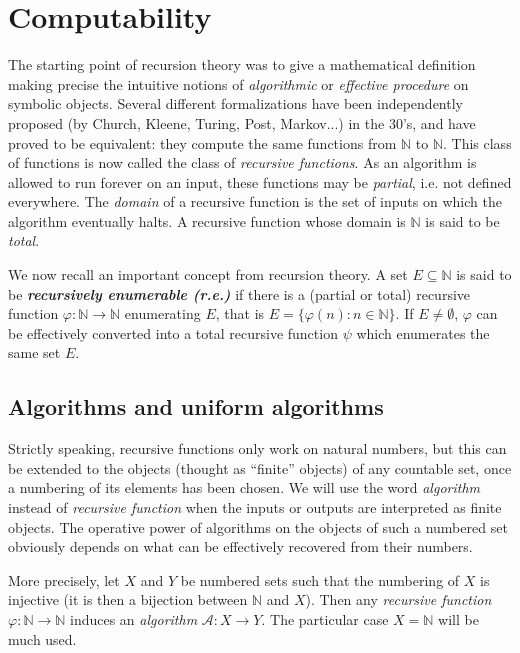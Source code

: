 \documentclass[copyright,creativecommons]{eptcs}
\numberwithin{equation}{section}
\begin{document}
\section{Computability}

The starting point of recursion theory was to give a mathematical definition
making precise the intuitive notions of \emph{algorithmic} or \emph{effective procedure} on symbolic objects. Several different formalizations
have been independently proposed (by Church, Kleene, Turing, Post,
Markov...) in the 30's, and have proved to be equivalent: they compute the
same functions from $\mathbb{N}$ to $\mathbb{N}$. This class of functions is
now called the class of \emph{recursive functions}. As an algorithm is
allowed to run forever on an input, these functions may be \emph{partial},
i.e. not defined everywhere. The \emph{domain} of a recursive function is
the set of inputs on which the algorithm eventually halts. A recursive
function whose domain is $\mathbb{N}$ is said to be \emph{total}.

We now recall an important concept from recursion theory. A set $E\subseteq
\mathbb{N}$ is said to be \textbf{\emph{recursively enumerable (r.e.)}} if
there is a (partial or total) recursive function $\varphi :\mathbb{N}\rightarrow \mathbb{N}$ enumerating $E$, that is $E=\{\varphi (n):n\in
\mathbb{N}\}$. If $E\neq \emptyset $, $\varphi $ can be effectively
converted into a total recursive function $\psi $ which enumerates the same
set $E$.

\subsection{Algorithms and uniform algorithms}

Strictly speaking, recursive functions only work on natural numbers, but
this can be extended to the objects (thought as ``finite'' objects) of any
countable set, once a numbering of its elements has been chosen. We will use
the word \emph{algorithm} instead of \emph{recursive function} when the
inputs or outputs are interpreted as finite objects. The operative power of
algorithms on the objects of such a numbered set obviously depends on what
can be effectively recovered from their numbers.

More precisely, let $X$ and $Y$ be numbered sets such that the numbering of $X$ is injective (it is then a bijection between $\mathbb{N}$ and $X$). Then
any \emph{recursive function} $\varphi:\mathbb{N}\to\mathbb{N} $ induces an
\emph{algorithm} $\mathcal{A}:X\to Y$. The particular case $X=\mathbb{N}$
will be much used.
\end{document}
